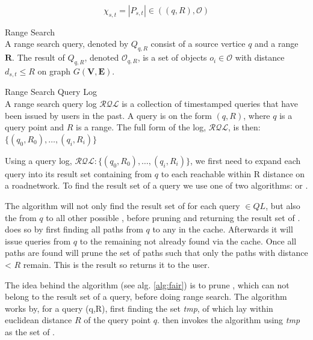 \begin{equation}
\chi_{s,t}  = | P_{s,t} | \in ((q,R), \mathcal{O}) 
\end{equation}

\begin{definition}{ Range Search}\\
A range search query, denoted by $Q_{q,R}$ consist of a source vertice $q$ and a range $\mathbf{R}$.
The result of $Q_{q,R}$, denoted $\mathcal{O}_{q,R}$, is a set of objects $o_i \in \mathcal{O}$ with \spath distance $d_{s,t} \leq R$ on graph $G\mathbf{(V,E)}$.
\end{definition}


\begin{definition}{Range Search Query Log}\\
A range search query log $\mathcal{RQL}$ is a collection of timestamped queries that have been issued by users in the past.
A query is on the form $(q,R)$, where $q$ is a query point and $R$ is a range. The full form of the log, $\mathcal{RQL}$,  is then: $\{(q_0,R_0),\dots,(q_i,R_i)\}$
\end{definition}


Using a query log, $\mathcal{RQL}: \{(q_0,R_0),\dots,(q_i,R_i)\}$, we first need to expand each query into its \spath result set containing \spaths from $q$ to each \poi reachable within R distance on a roadnetwork. 
To find the result set of a query we use one of two algorithms: \naive or \fairns.

The \naive algorithm will not only find the result set of \spath for each query $\in QL$, but also the \spath from $q$ to all other possible \poins, before pruning and returning the result set of \poisns.
\naive does so by first finding all paths from $q$ to any \poi in the cache. Afterwards it will issue \spath queries from $q$ to the remaining \pois not already found via the cache. 
Once all paths are found \naive will prune the set of paths such that only the paths with distance < $R$ remain. This is the result so \naive returns it to the user.

The idea behind the \fair algorithm (see alg. \ref{alg:fair}) is to prune \poisns, which can not belong to the result set of a query, before doing range search. The \fair algorithm works by, for a query (q,R), first finding the set {\it tmp\poins}, of \pois which lay within euclidean distance $R$ of the query point $q$. \fair then invokes the \naive algorithm using {\it tmp\poins} as the set of \poins.






